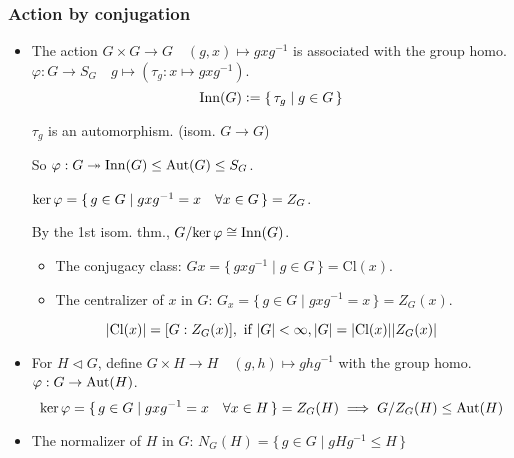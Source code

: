 \subsubsection{Action by conjugation}
\begin{itemize}
  \item The action $G \times G \to G \quad (g,x) \mapsto gxg^{-1}$ is
    associated with the group homo. $\varphi: G \to S_G \quad g \mapsto
    (\tau_g: x \mapsto gxg^{-1})$.
    \[
      \operatorname{Inn}(G) \vcentcolon= \{\, \tau_g \mid g \in G \,\}
    \]

    \begin{fact} 
      $\tau_g$ is an automorphism. (isom. $G \to G$)
    \end{fact}

    So $\varphi: G \twoheadrightarrow \operatorname{Inn}(G) \le \operatorname{Aut}(G) \le S_G$.

    $\operatorname{ker}\varphi = \{\, g\in G \mid gxg^{-1} = x \quad \forall x \in G \,\}
    = Z_G$.

    By the 1st isom. thm., ${G}/{\operatorname{ker}\varphi} \cong \operatorname{Inn}(G)$.
    \begin{itemize}
      \item The conjugacy class:
        $Gx = \{\, gxg^{-1} \mid g \in G \,\} = \text{Cl}(x)$.
      \item The centralizer of $x$ in $G$:
        $G_x = \{\, g \in G \mid gxg^{-1} = x \,\} = Z_G(x)$.
    \end{itemize}
    \[
      \lvert\text{Cl}(x)\rvert = [G:Z_G(x)], \text{~if~} \lvert G\rvert < \infty, 
      \lvert G\rvert = \lvert\text{Cl}(x)\rvert\lvert Z_G(x)\rvert
    \]
  \item For $H \lhd G$, define $G \times H \to H \quad (g, h) \mapsto ghg^{-1}$
    with the group homo. $\varphi: G \to \operatorname{Aut}(H)$.
    \[
      \operatorname{ker}\varphi = \{\, g\in G \mid gxg^{-1} = x \quad \forall x \in H \,\}
      = Z_G(H)
      \implies {G}/{Z_G(H)} \le \operatorname{Aut}(H)
    \]
  \item The normalizer of $H$ in $G$:
    $N_G(H) = \{\, g\in G \mid gHg^{-1} \le H \,\}$
\end{itemize}
